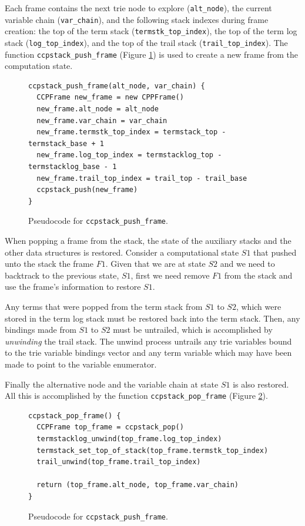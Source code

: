Each frame contains the next trie node to explore (\texttt{alt\_node}),
the current variable chain (\texttt{var\_chain}),
and the following stack indexes during frame creation:
the top of the term stack (\texttt{termstk\_top\_index}),
the top of the term log stack (\texttt{log\_top\_index}),
and the top of the trail stack (\texttt{trail\_top\_index}).
The function \texttt{ccpstack\_push\_frame} (Figure \ref{fig:ccpstack_push_frame})
is used to create a new frame from the computation state.

\begin{figure}[ht]
\begin{Verbatim}[fontsize=\small]
ccpstack_push_frame(alt_node, var_chain) {
  CCPFrame new_frame = new CPPFrame()
  new_frame.alt_node = alt_node
  new_frame.var_chain = var_chain
  new_frame.termstk_top_index = termstack_top - termstack_base + 1
  new_frame.log_top_index = termstacklog_top - termstacklog_base - 1
  new_frame.trail_top_index = trail_top - trail_base
  ccpstack_push(new_frame)
}
\end{Verbatim}
\caption{Pseudo\-code for \texttt{ccpstack\_push\_frame}.}
\label{fig:ccpstack_push_frame}
\end{figure}

When popping a frame from the stack, the state of the auxiliary stacks and the other data
structures is restored. Consider a computational state $S1$ that pushed unto the stack
the frame $F1$. Given that we are at state $S2$ and we need to backtrack to the previous state, $S1$,
first we need remove $F1$ from the stack and use the frame's information to restore $S1$.

Any terms that were popped from the term stack from $S1$ to $S2$, which were
stored in the term log stack must be restored back into the term stack.
Then, any bindings made from $S1$ to $S2$ must be untrailed, which is
accomplished by \textit{unwinding} the trail stack. The unwind process untrails
any trie variables bound to the trie variable bindings vector
and any term variable which may have been made to point to the variable enumerator. 

Finally the alternative node and
the variable chain at state $S1$ is also restored. All this is accomplished by the
function \texttt{ccpstack\_pop\_frame} (Figure \ref{fig:ccpstack_pop_frame}).

\begin{figure}[h]
\begin{Verbatim}[fontsize=\small]
ccpstack_pop_frame() {
  CCPFrame top_frame = ccpstack_pop()
  termstacklog_unwind(top_frame.log_top_index)
  termstack_set_top_of_stack(top_frame.termstk_top_index)
  trail_unwind(top_frame.trail_top_index)
  
  return (top_frame.alt_node, top_frame.var_chain)
}
\end{Verbatim}
\caption{Pseudo\-code for \texttt{ccpstack\_push\_frame}.}
\label{fig:ccpstack_pop_frame}
\end{figure}

